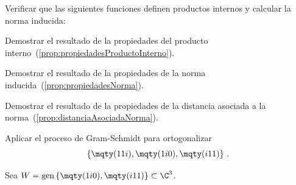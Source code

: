
\begin{questions}

  \question Verificar que las siguientes funciones definen productos internos y calcular la norma inducida:

  \question
  \label{ex:propiedadesProductoInterno}
  Demostrar el resultado de la propiedades del producto interno~(\ref{prop:propiedadesProductoInterno}).

  \question
  \label{ex:propiedadesNorma}
  Demostrar el resultado de la propiedades de la norma inducida~(\ref{prop:propiedadesNorma}).

  \question
  \label{ex:distanciaAsociadaNorma}
  Demostrar el resultado de la propiedades de la distancia asociada a la norma~(\ref{prop:distanciaAsociadaNorma}).

  \question Aplicar el proceso de Gram-Schmidt para ortogonalizar
  \[
    \left\{\mqty(1\\ 1\\ i), \mqty(1\\ i\\ 0), \mqty(i\\ 1\\ 1)\right\}\,.
  \]

  \question Sea $W = \text{gen}\left\{\mqty(1\\ i\\ 0), \mqty(i\\ 1\\ 1)\right\} \subset \C^3$.
\end{questions}
